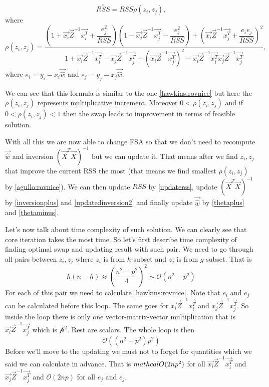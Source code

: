 \begin{equation} \label{updaterss}
	\overline{\overline{RSS}}  = RSS\rho(z_i, z_j),
\end{equation}
where
\begin{equation} \label{agullo:rovnice}
	\rho(z_i, z_j) =
	 \dfrac
	 {(1+\vec{x_i}\vec{Z}^{-1}\vec{x_i^T} + \dfrac{e_j^2}{RSS})
		(1 - \vec{x_j}\vec{Z}^{-1}\vec{x_j^T} - \dfrac{e_i^2}{RSS} )+
		(\vec{x_i}\vec{Z}^{-1}\vec{x_j^T} + \dfrac{e_i e_j}{RSS} )^2}
	{1 + \vec{x_i}\vec{Z}^{-1}\vec{x_i^T}  - \vec{x_j}\vec{Z}^{-1}\vec{x_j^T}  + ( \vec{x_i}\vec{Z}^{-1}\vec{x_j^T})^2 -   \vec{x_i}\vec{Z}^{-1}\vec{x_i^T}\vec{x_j}\vec{Z}^{-1}\vec{x_j^T} },
\end{equation}
where $e_i = y_i - x_i\vec{\hat{w}}$ and $e_j = y_j - x_j\vec{\hat{w}}$.

We can see that this formula is similar to the one \ref{hawkins:rovnice} but here the $\rho(z_i, z_j)$ represents multiplicative increment. Moreover $0 < \rho(z_i, z_j) $ and if $0 < \rho(z_i, z_j)< 1 $ then the swap leads to improvement in terms of feasible solution.

With all this we are now able to change FSA so that we don't need to recompute $\vec{\hat{w}}$ and inversion $(\vec{X}^T \vec{X})^{-1}$ but we can update it. That means after we find $z_i, z_j$ that improve the current RSS the most (that means we find smallest $\rho(z_i, z_j)$ by \ref{agullo:rovnice}). We can then update $RSS$ by \ref{updaterss}, update $(\vec{X}^T \vec{X})^{-1}$ by \ref{inversionplus} and \ref{updatedinversion2} and finally update $\vec{\hat{w}}$ by \ref{thetaplus} and \ref{thetaminus}.



Let's now talk about time complexity of such solution. We can clearly see that core iteration takes the most time. So let's first describe time complexity of finding optimal swap and updating result with such pair. 
We need to go through all pairs between $z_i, z_j$ where $z_i$ is from $h$-subset and $z_j$ is from $g$-subset. That is 
\begin{equation}
	h(n-h) \approx (\frac{n^2 - p^2}{4})^2 \sim \mathcal{O}(n^2 - p^2)
\end{equation}
For each of this pair we need to calculate \ref{hawkins:rovnice}. Note that $e_i$ and $e_j$ can be calculated before this loop. The same goes for $\vec{x_i}\vec{Z}^{-1}\vec{x_i^T}$ and $\vec{x_j}\vec{Z}^{-1}\vec{x_j^T} $. So inside the loop there is only one vector-matrix-vector multiplication that is $\vec{x_i}\vec{Z}^{-1}\vec{x_j^T}$ which is $\mathcal{p^2}$. Rest are scalars. The whole loop is then 
\begin{equation}
	\mathcal{O}( (n^2 - p^2) p^2) 
\end{equation}
Before we'll move to the updating we must not to forget for quantities which we said we can calculate in advance. That is $\\mathcal{O}(2np^2)$ for all $\vec{x_i}\vec{Z}^{-1}\vec{x_i^T}$ and $\vec{x_j}\vec{Z}^{-1}\vec{x_j^T}$ and $\mathcal{O}(2np)$ for all $e_j$ and $e_j$.

